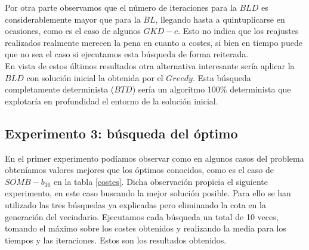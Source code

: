 \documentclass[11pt,a4paper]{article}
\begin{document}
	Por otra parte observamos que el número de iteraciones para la $BLD$ es considerablemente mayor que para la $BL$, llegando hasta a quintuplicarse en ocasiones, como es el caso de algunos $GKD-c$. Esto no indica que los reajustes realizados realmente merecen la pena en cuanto a costes, si bien en tiempo puede que no sea el caso si ejecutamos esta búsqueda de forma reiterada. \\
	
	En vista de estos últimos resultados otra alternativa interesante sería aplicar la $BLD$ con solución inicial la obtenida por el $Greedy$. Esta búsqueda completamente determinista ($BTD$) sería un algoritmo 100\% determinista que explotaría en profundidad el entorno de la solución inicial. \\
	
	\subsection{ Experimento 3: búsqueda del óptimo }
	
	En el primer experimento podíamos observar como en algunos casos del problema obteníamos valores mejores que los óptimos conocidos, como es el caso de $SOMB-b_16$ en la tabla \ref{costes}. Dicha observación propicia el siguiente experimento, en este caso buscando la mejor solución posible. Para ello se han utilizado las tres búsquedas ya explicadas pero eliminando la cota en la generación del vecindario. Ejecutamos cada búsqueda un total de 10 veces, tomando el máximo sobre los costes obtenidos y realizando la media para los tiempos y las iteraciones. Estos son los resultados obtenidos. \\
	
\end{document}
